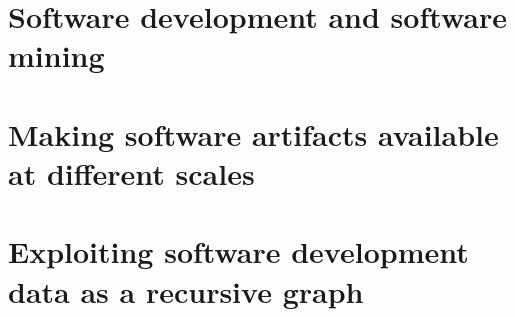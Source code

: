 \documentclass[a4paper,11pt,openbib]{memoir}
\begin{document}
\raggedbottom

\frontmatter
%

\clearemptydoublepage

%

\clearemptydoublepage
%

\clearemptydoublepage


\renewcommand{\contentsname}{Table of Contents}
\tableofcontents*
{}
%


\clearemptydoublepage

\iffalse
\listoftables
\addtocontents{lot}{\par\nobreak\textbf{{\scshape Table} \hfill Page}\par\nobreak}
\clearemptydoublepage
\listoffigures
\addtocontents{lof}{\par\nobreak\textbf{{\scshape Figure} \hfill Page}\par\nobreak}
\clearemptydoublepage
\fi
%
%
\mainmatter
%
\glsresetall


\part{Software development and software mining}







\part{Making software artifacts available at different scales}





\part{Exploiting software development data as a recursive graph}
\end{document}
